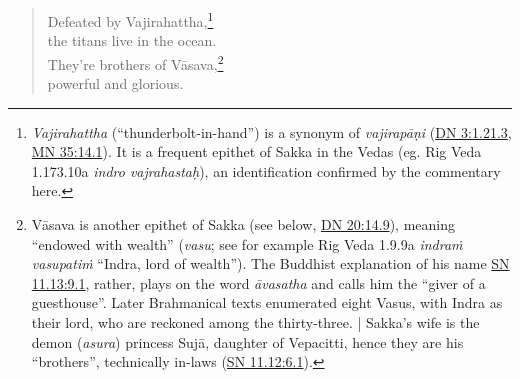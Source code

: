 \documentclass[12pt,openany]{book}%
\begin{document}
\begin{verse}
Defeated by Vajirahattha,\footnote{\textit{Vajirahattha} (“thunderbolt-in-hand”) is a synonym of \textit{\textsanskrit{vajirapāṇi}} (\href{https://suttacentral.net/dn3/en/sujato\#1.21.3}{DN 3:1.21.3}, \href{https://suttacentral.net/mn35/en/sujato\#14.1}{MN 35:14.1}). It is a frequent epithet of Sakka in the Vedas (eg. Rig Veda 1.173.10a \textit{indro vajrahastaḥ}), an identification confirmed by the commentary here. } \\
the titans live in the ocean. \\
They’re brothers of \textsanskrit{Vāsava},\footnote{\textsanskrit{Vāsava} is another epithet of Sakka (see below, \href{https://suttacentral.net/dn20/en/sujato\#14.9}{DN 20:14.9}), meaning “endowed with wealth” (\textit{vasu}; see for example Rig Veda 1.9.9a \textit{\textsanskrit{indraṁ} \textsanskrit{vasupatiṁ}} “Indra, lord of wealth”). The Buddhist explanation of his name \href{https://suttacentral.net/sn11.13/en/sujato\#9.1}{SN 11.13:9.1}, rather, plays on the word \textit{\textsanskrit{āvasatha}} and calls him the “giver of a guesthouse”. Later Brahmanical texts enumerated eight Vasus, with Indra as their lord, who are reckoned among the thirty-three. | Sakka's wife is the demon (\textit{asura}) princess \textsanskrit{Sujā}, daughter of Vepacitti, hence they are his “brothers”, technically in-laws (\href{https://suttacentral.net/sn11.12/en/sujato\#6.1}{SN 11.12:6.1}). } \\
powerful and glorious. 


\end{verse}
\end{document}
